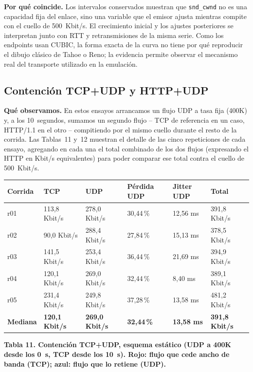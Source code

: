 \documentclass[11pt,a4paper]{article}
\newcommand{\figcaption}[1]{\par\noindent\footnotesize\textbf{#1}\par\vspace{0.4cm}}
\begin{document}
\textbf{Por qu\'e coincide.} Los intervalos conservados muestran que \texttt{snd\_cwnd} no es una capacidad fija del enlace, sino una variable que el emisor ajusta mientras compite con el cuello de 500~Kbit/s. El crecimiento inicial y los ajustes posteriores se interpretan junto con RTT y retransmisiones de la misma serie. Como los endpoints usan CUBIC, la forma exacta de la curva no tiene por qu\'e reproducir el dibujo cl\'asico de Tahoe o Reno; la evidencia permite observar el mecanismo real del transporte utilizado en la emulaci\'on.

\subsection*{Contenci\'on TCP+UDP y HTTP+UDP}

\textbf{Qu\'e observamos.} En estos ensayos arrancamos un flujo UDP a tasa fija (400K) y, a los 10~segundos, sumamos un segundo flujo -- TCP de referencia en un caso, HTTP/1.1 en el otro -- compitiendo por el mismo cuello durante el resto de la corrida. Las Tablas~11 y~12 muestran el detalle de las cinco repeticiones de cada ensayo, agregando en cada una el total combinado de los dos flujos (expresando el HTTP en Kbit/s equivalentes) para poder comparar ese total contra el cuello de 500~Kbit/s.

\needspace{1cm}
\begin{center}
\begin{minipage}{0.96\linewidth}
\centering
\small
\setlength{\tabcolsep}{3pt}
\begin{tabular}{@{}p{1.6cm}p{2.3cm}p{2.3cm}p{2.3cm}p{2.2cm}p{2.4cm}@{}}
\toprule
\textbf{Corrida} & \textbf{TCP} & \textbf{UDP} & \textbf{P\'erdida UDP} & \textbf{Jitter UDP} & \textbf{Total} \\
\midrule
r01 & \cellcolor{red!20}113,8 Kbit/s & \cellcolor{blue!15}278,0 Kbit/s & 30,44\,\% & 12,56 ms & 391,8 Kbit/s \\
r02 & \cellcolor{red!20}90,0 Kbit/s & \cellcolor{blue!15}288,4 Kbit/s & 27,84\,\% & 15,13 ms & 378,5 Kbit/s \\
r03 & \cellcolor{red!20}141,5 Kbit/s & \cellcolor{blue!15}253,4 Kbit/s & 36,44\,\% & 21,69 ms & 394,9 Kbit/s \\
r04 & \cellcolor{red!20}120,1 Kbit/s & \cellcolor{blue!15}269,0 Kbit/s & 32,44\,\% & 8,40 ms & 389,1 Kbit/s \\
r05 & \cellcolor{red!20}231,4 Kbit/s & \cellcolor{blue!15}249,8 Kbit/s & 37,28\,\% & 13,58 ms & 481,2 Kbit/s \\
\midrule
\textbf{Mediana} & \cellcolor{red!20}\textbf{120,1 Kbit/s} & \cellcolor{blue!15}\textbf{269,0 Kbit/s} & \textbf{32,44\,\%} & \textbf{13,58 ms} & \textbf{391,8 Kbit/s} \\
\bottomrule
\end{tabular}
\par\vspace{0.1cm}
\figcaption{Tabla 11. Contenci\'on TCP+UDP, esquema est\'atico (UDP a 400K desde los 0~s, TCP desde los 10~s). Rojo: flujo que cede ancho de banda (TCP); azul: flujo que lo retiene (UDP).}
\end{minipage}
\end{center}
\end{document}
